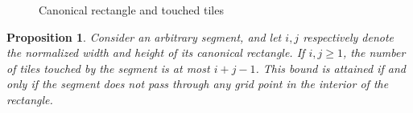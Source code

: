 \documentclass[12pt, a4paper]{article}
\newtheorem{proposition}{Proposition}%
\begin{document}
\begin{figure}
\centering%
\hfill%
%
\caption{Canonical rectangle and touched tiles
}%
\label{fig: canonical rectangle and touched tiles}%
\end{figure}%

\begin{proposition}
\label{prop: i+j-1}
Consider an arbitrary segment, and let $i, j$ respectively denote the normalized width and height of its canonical rectangle. If $i, j \geq 1$, the number of tiles touched by the segment is at most $i+j-1$. This bound is attained if and only if the segment does not pass through any grid point in the interior of the rectangle.
\end{proposition}
\end{document}
